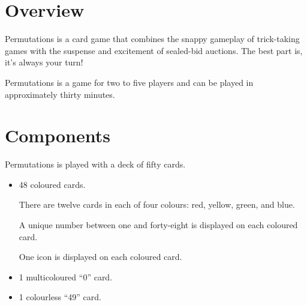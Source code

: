 \documentclass[a6paper, parskip=half, DIV=14, 10pt]{scrartcl}
\begin{document}
\newpage
\setmainfont{Tex Gyre Schola}%
\raggedright%
\section*{Overview}
Permutations is a card game that combines the snappy gameplay of trick-taking games with the suspense and excitement of sealed-bid auctions. The best part is, it's always your turn!

Permutations is a game for two to five players and can be played in approximately thirty minutes.

\vfill

\section*{Components}
Permutations is played with a deck of fifty cards.
\begin{itemize}[leftmargin=*]
\item 48 coloured cards.

There are twelve cards in each of four colours: red, yellow, green, and blue.

A unique number between one and forty-eight is displayed on each coloured card.

One icon is displayed on each coloured card.
\item 1 multicoloured ``0'' card.
\item 1 colourless ``49'' card.
\end{itemize}

\vfill
\end{document}
